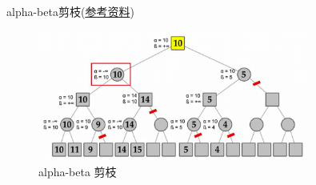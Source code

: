 \begin{remark}
    alpha-beta剪枝(\href{https://oiwiki.org/search/alpha-beta/}{参考资料}) 
    
    \begin{figure}[htbp]
        \centering
        \includegraphics[width=0.8\textwidth]{./figure/fig8.png}
        \caption{alpha-beta 剪枝 \label{fig8}}
    \end{figure}
\end{remark}


